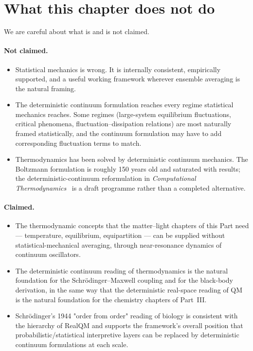 \section{What this chapter does not do}\label{sec:thermo-not}

We are careful about what is and is not claimed.

\paragraph{Not claimed.}
\begin{itemize}
\item Statistical mechanics is wrong. It is internally consistent, empirically supported, and a useful working framework wherever ensemble averaging is the natural framing.
\item The deterministic continuum formulation reaches every regime statistical mechanics reaches. Some regimes (large-system equilibrium fluctuations, critical phenomena, fluctuation--dissipation relations) are most naturally framed statistically, and the continuum formulation may have to add corresponding fluctuation terms to match.
\item Thermodynamics has been solved by deterministic continuum mechanics. The Boltzmann formulation is roughly 150 years old and saturated with results; the deterministic-continuum reformulation in \emph{Computational Thermodynamics}~\cite{BodyAndSoulV} is a draft programme rather than a completed alternative.
\end{itemize}

\paragraph{Claimed.}
\begin{itemize}
\item The thermodynamic concepts that the matter--light chapters of this Part need --- temperature, equilibrium, equipartition --- can be supplied without statistical-mechanical averaging, through near-resonance dynamics of continuum oscillators.
\item The deterministic continuum reading of thermodynamics is the natural foundation for the Schr\"odinger--Maxwell coupling and for the black-body derivation, in the same way that the deterministic real-space reading of QM is the natural foundation for the chemistry chapters of Part~III.
\item Schr\"odinger's 1944 "order from order" reading of biology is consistent with the hierarchy of RealQM and supports the framework's overall position that probabilistic/statistical interpretive layers can be replaced by deterministic continuum formulations at each scale.
\end{itemize}

